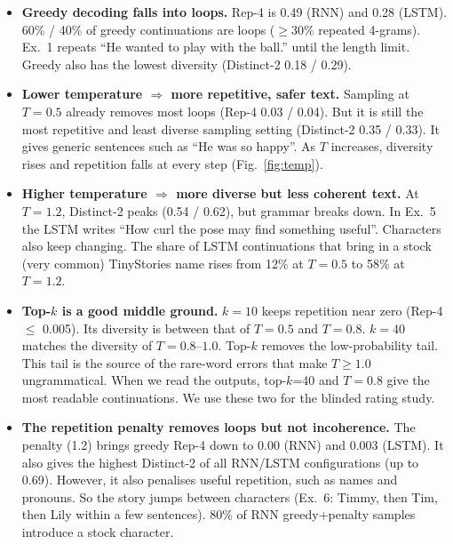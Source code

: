 \documentclass[11pt,a4paper]{article}
\begin{document}
\begin{itemize}
\item \textbf{Greedy decoding falls into loops.} Rep-4 is 0.49 (RNN) and 0.28 (LSTM).
  60\% / 40\% of greedy continuations are loops ($\geq$30\% repeated 4-grams). Ex.~1 repeats ``He
  wanted to play with the ball.'' until the length limit. Greedy also has the lowest diversity
  (Distinct-2 0.18 / 0.29).
\item \textbf{Lower temperature $\Rightarrow$ more repetitive, safer text.} Sampling at $T=0.5$
  already removes most loops (Rep-4 0.03 / 0.04). But it is still the most repetitive and least
  diverse sampling setting (Distinct-2 0.35 / 0.33). It gives generic sentences such as
  ``He was so happy''. As $T$ increases, diversity rises and repetition falls at every step (Fig.~\ref{fig:temp}).
\item \textbf{Higher temperature $\Rightarrow$ more diverse but less coherent text.} At $T=1.2$,
  Distinct-2 peaks (0.54 / 0.62), but grammar breaks down. In Ex.~5 the LSTM writes ``How curl the
  pose may find something useful''. Characters also keep changing. The share of LSTM continuations
  that bring in a stock (very common) TinyStories name rises from 12\% at $T=0.5$ to 58\% at $T=1.2$.
\item \textbf{Top-$k$ is a good middle ground.} $k=10$ keeps repetition near zero (Rep-4 $\leq$
  0.005). Its diversity is between that of $T=0.5$ and $T=0.8$. $k=40$ matches the diversity of
  $T=0.8$--$1.0$. Top-$k$ removes the low-probability tail. This tail is the source of the rare-word
  errors that make $T\geq1.0$ ungrammatical.
  When we read the outputs, top-$k$=40 and $T=0.8$ give the most readable continuations. We use
  these two for the blinded rating study.
\item \textbf{The repetition penalty removes loops but not incoherence.} The penalty (1.2) brings
  greedy Rep-4 down to 0.00 (RNN) and 0.003 (LSTM). It also gives the highest Distinct-2 of all
  RNN/LSTM configurations (up to 0.69). However, it also penalises useful repetition, such as names
  and pronouns. So the story jumps between characters (Ex.~6: Timmy, then Tim, then Lily within a
  few sentences). 80\% of RNN greedy+penalty samples introduce a stock character.
\end{itemize}
\end{document}
